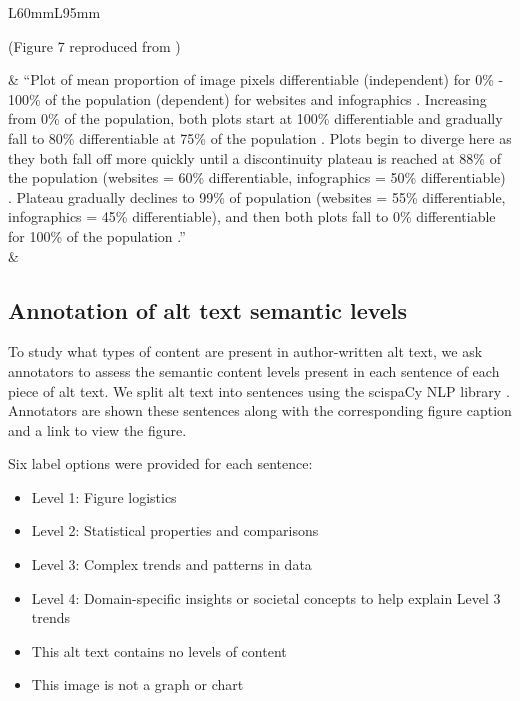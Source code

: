 \documentclass[sigconf]{acmart}
\begin{document}
\begin{table}[tbhp!]
\begin{tabular}{L{60mm}L{95mm}}
        \begin{center}(Figure 7 reproduced from \citet{Reinecke2016EnablingDT})\end{center} &  ``Plot of mean proportion of image pixels differentiable (independent) for 0\% - 100\% of the population (dependent) for websites and infographics . Increasing from 0\% of the population, both plots start at 100\% differentiable and gradually fall to 80\% differentiable at 75\% of the population . Plots begin to diverge here as they both fall off more quickly until a discontinuity plateau is reached at 88\% of the population (websites = 60\% differentiable, infographics = 50\% differentiable) . Plateau gradually declines to 99\% of population (websites = 55\% differentiable, infographics = 45\% differentiable), and then both plots fall to 0\% differentiable for 100\% of the population .'' \\
         & \\
        \bottomrule
    \end{tabular}
    \caption{Example figures and author-written alt text with annotated semantic levels added to the end of each sentence, with the prefix L, in parentheses and colored .}
    \label{tab:example_figures}
\end{table}

\subsection{Annotation of alt text semantic levels}

To study what types of content are present in author-written alt text, we ask annotators to assess the semantic content levels present in each sentence of each piece of alt text. We split alt text into sentences using the scispaCy NLP library \citep{Neumann2019ScispaCyFA}. Annotators are shown these sentences along with the corresponding figure caption and a link to view the figure. 
 

Six label options were provided for each sentence:

\begin{itemize}
    \item Level 1: Figure logistics

    \item Level 2: Statistical properties and comparisons
    \item Level 3: Complex trends and patterns in data
    \item Level 4: Domain-specific insights or societal concepts to help explain Level 3 trends
    \item This alt text contains no levels of content
    \item This image is not a graph or chart
\end{itemize}
\end{document}
